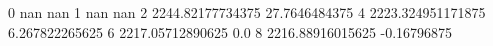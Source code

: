 0 nan nan
1 nan nan
2 2244.82177734375 27.7646484375
4 2223.324951171875 6.267822265625
6 2217.05712890625 0.0
8 2216.88916015625 -0.16796875
